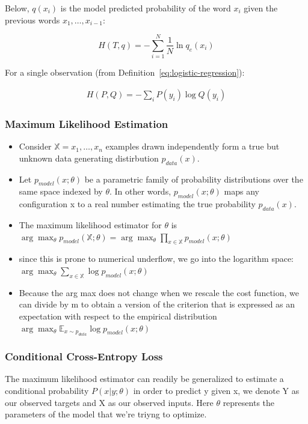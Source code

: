 \documentclass[11pt]{article}
\begin{document}
Below, $q(x_i)$ is the model predicted probability of the word $x_i$ given the previous words $x_1, \ldots, x_{i-1}$:

\begin{equation*}
    H(T,q)=-\sum^N_{i=1}\frac 1 N \ln q_e(x_i)
\end{equation*}

For a single observation (from Definition~\ref{eq:logistic-regression}):

\begin{align*}
    H(P,Q) = -\sum_i P(y_i)\log Q(y_i) 
\end{align*}    

\subsubsection{Maximum Likelihood Estimation}

\begin{itemize}
    \item Consider $\mathbb{X} = {x_1, \ldots, x_n}$ examples drawn independently form a true but unknown data generating distirbution $p_{data}(x)$.
    \item Let $p_{model}(x;\theta)$ be a parametric family of probability distributions over the same space indexed by $\theta$. In other words, $p_{model}(x;\theta)$ maps any configuration x to a real number estimating the true probability $p_{data}(x)$.
    \item The maximum likelihood estimator for $\theta$ is $\arg \max _\theta p_{model}(\mathbb{X};\theta) = \arg \max _\theta \prod_{x\in \mathbb{X}} p_{model}(x;\theta)$
    \item since this is prone to numerical underflow, we go into the logarithm space: \\ $\arg \max_\theta \sum_{x\in \mathbb{X}} \log p_{model}(x;\theta)$
    \item Because the arg max does not change when we rescale the cost function, we can divide by m to obtain a version of the criterion that is expressed as an expectation with respect to the empirical distribution $\arg \max _\theta \mathbb{E}_{x\sim \hat{p}_{data}} \log p_{model}(x;\theta)$
\end{itemize}

\subsubsection{Conditional Cross-Entropy Loss}

The maximum likelihood estimator can readily be generalized to estimate a conditional probability $P(x|y;\theta)$ in order to predict y given x, we denote Y as our observed targets and X as our observed inputs. Here $\theta$ represents the parameters of the model that we're triyng to optimize.
\end{document}
